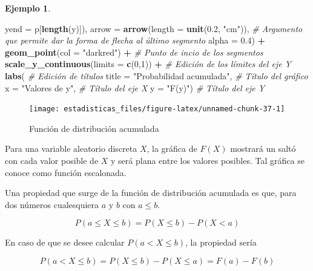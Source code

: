 \documentclass[
  11pt,
]{book}
\newenvironment{Shaded}{\begin{snugshade}}{\end{snugshade}}
\newcommand{\AttributeTok}[1]{\textcolor[rgb]{0.13,0.29,0.53}{#1}}
\newcommand{\CommentTok}[1]{\textcolor[rgb]{0.56,0.35,0.01}{\textit{#1}}}
\newcommand{\DecValTok}[1]{\textcolor[rgb]{0.00,0.00,0.81}{#1}}
\newcommand{\FloatTok}[1]{\textcolor[rgb]{0.00,0.00,0.81}{#1}}
\newcommand{\FunctionTok}[1]{\textcolor[rgb]{0.13,0.29,0.53}{\textbf{#1}}}
\newcommand{\NormalTok}[1]{#1}
\newcommand{\SpecialCharTok}[1]{\textcolor[rgb]{0.81,0.36,0.00}{\textbf{#1}}}
\newcommand{\StringTok}[1]{\textcolor[rgb]{0.31,0.60,0.02}{#1}}
\theoremstyle{definition}
\theoremstyle{definition}
\newtheorem{example}{Ejemplo}[chapter]
\theoremstyle{definition}
\theoremstyle{definition}
\theoremstyle{remark}
\begin{document}
\begin{example}
\begin{Shaded}
\begin{Highlighting}[]
        \AttributeTok{yend =}\NormalTok{ p[}\FunctionTok{length}\NormalTok{(y)]),}
    \AttributeTok{arrow =} \FunctionTok{arrow}\NormalTok{(}\AttributeTok{length =} \FunctionTok{unit}\NormalTok{(}\FloatTok{0.2}\NormalTok{, }\StringTok{"cm"}\NormalTok{)), }\CommentTok{\# Argumento que permite dar la forma de flecha al último segmento}
    \AttributeTok{alpha =} \FloatTok{0.4}\NormalTok{) }\SpecialCharTok{+}
  \FunctionTok{geom\_point}\NormalTok{(}\AttributeTok{col =} \StringTok{"darkred"}\NormalTok{) }\SpecialCharTok{+} \CommentTok{\# Punto de incio de los segmentos}
  \FunctionTok{scale\_y\_continuous}\NormalTok{(}\AttributeTok{limits =} \FunctionTok{c}\NormalTok{(}\DecValTok{0}\NormalTok{,}\DecValTok{1}\NormalTok{)) }\SpecialCharTok{+} \CommentTok{\# Edición de los límites del eje Y}
  \FunctionTok{labs}\NormalTok{( }\CommentTok{\# Edición de títulos}
    \AttributeTok{title =} \StringTok{"Probabilidad acumulada"}\NormalTok{, }\CommentTok{\# Título del gráfico}
    \AttributeTok{x =} \StringTok{"Valores de y"}\NormalTok{, }\CommentTok{\# Título del eje X}
    \AttributeTok{y =} \StringTok{"F(y)"}\NormalTok{) }\CommentTok{\# Título del eje Y}
\end{Highlighting}
\end{Shaded}

\begin{figure}

{\centering \texttt{[image: estadisticas\_files/figure-latex/unnamed-chunk-37-1]} 

}

\caption{Función de distribución acumulada}\label{fig:unnamed-chunk-37}
\end{figure}

Para una variable aleatorio discreta \(X\), la gráfica de \(F(X)\) mostrará un saltó con cada valor posible de \(X\) y será plana entre los valores posibles. Tal gráfica se conoce como función escalonada.
\end{example}

Una propiedad que surge de la función de distribución acumulada es que, para dos números cualesquiera \(a\) y \(b\) con \(a\leq b\).

\begin{equation}
P(a\leq X \leq b) = P(X \leq b) - P(X < a)
\label{eq:fda2}
\end{equation}

En caso de que se desee calcular \(P(a < X \leq b)\), la propiedad sería

\begin{equation}
P(a < X \leq b) = P(X \leq b) - P(X \leq a) = F(a) - F(b)
\label{eq:fda3}
\end{equation}
\end{document}
